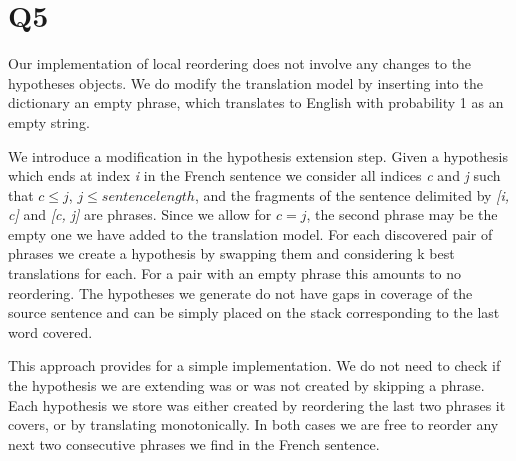\section*{Q5}

Our implementation of local reordering does not involve any changes to the hypotheses objects. We do modify the translation model by inserting into the dictionary an empty phrase, which translates to English with probability 1 as an empty string.

We introduce a modification in the hypothesis extension step. Given a hypothesis which ends at index \textit{i} in the French sentence we consider all indices \textit{c} and \textit{j} such that $c \leq j$, $j \leq sentence length$, and the fragments of the sentence delimited by \textit{[i, c]} and \textit{[c, j]} are phrases. Since we allow for $c = j$, the second phrase may be the empty one we have added to the translation model. For each discovered pair of phrases we create a hypothesis by swapping them and considering k best translations for each. For a pair with an empty phrase this amounts to no reordering. The hypotheses we generate do not have gaps in coverage of the source sentence and can be simply placed on the stack corresponding to the last word covered.

This approach provides for a simple implementation. We do not need to check if the hypothesis we are extending was or was not created by skipping a phrase. Each hypothesis we store was either created by reordering the last two phrases it covers, or by translating monotonically. In both cases we are free to reorder any next two consecutive phrases we find in the French sentence.

